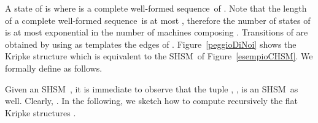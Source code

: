 \documentclass[letterpaper,twocolumn,10pt]{article}
\newtheorem{definition}{Definition}
\newcommand{\ignore}[1]{}
\newcommand{\VHSM}{SHSM}
\newcommand{\boxhsm}{box}   \newcommand{\boxes}{boxes}
\newcommand{\nnode}{node} \newcommand{\nnodes}{nodes} \newcommand{\expand} {\mathit{expn}}
\newcommand{\vertex}{\mbox{vertex}}   \newcommand{\vertices}{\mbox{vertices}}
\newcommand{\word}{well-formed sequence}
\begin{document}
A state of  is  where  is
a complete \word\ of .
Note that the length of a complete \word\ is at most , therefore
the number of states  of  is at most exponential in the number of
machines composing .
Transitions of  are obtained by using as templates the
edges of .
Figure~\ref{peggioDiNoi} shows the Kripke structure
which is equivalent to the \VHSM\ of Figure~\ref{esempioCHSM}.
We formally define  as follows.
\ignore{
\begin{definition}\label{semDef}
Given an \VHSM\ , the corresponding flat
Kripke structure  is defined as:
\begin{itemize}
\item The states of  are , for
, where  is a complete
\word.

\item The initial state of  is , where
 is the initial \vertex\ of 
(the top-level machine of ).

\item
If  and  are states, then  is a
transition of  if there is an edge , ,
such that one of the following cases occurs:
\begin{itemize}

\item , , for ,
and , that is the edge connects two \nnodes;

\item , , for , , and
, that is the edge connects a \nnode\  to
a \boxhsm\  and  is the initial \vertex\ of the
machine which  expands to;

\item , , for , and
, that is the edge connects a \boxhsm\
 to a \nnode\ , through the output \vertex\ ;

\item , , for , ,
 , and
,
that is the edge connects two \boxes.
\end{itemize}

\item
The labeling of  is such that a state
 is labeled by the set of atomic propositions
.
\end{itemize}

\end{definition}

A \emph{run} of an \VHSM\  is a path of  starting from .

\noindent{\bf An alternative recursive definition of .}\\
}
Given an \VHSM\ , it is immediate to
observe that the tuple , , is an \VHSM\ as well. Clearly, . In the following, we
sketch how to compute recursively the flat Kripke structures
.
\end{document}
